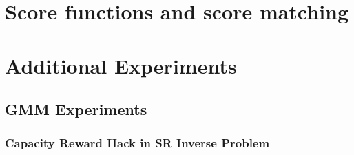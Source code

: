 \documentclass[12pt,a4paper]{report}
\begin{document}
\section{Score functions and score matching}
\label{sec:score_functions_and_score_matching}

\section{Additional Experiments}
\label{sec:additional_experiments}

\subsection{GMM Experiments}
\label{subsec:gmm_experiments}

\subsubsection{Capacity Reward Hack in SR Inverse Problem}
\label{subsubsec:capacity_reward_hack_in_sr_inverse_problem}
\end{document}
